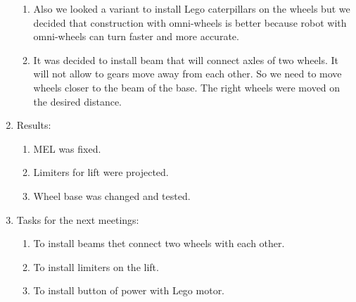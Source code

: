 \begin{enumerate}
\begin{enumerate}
		\item Also we looked a variant to install Lego caterpillars on the wheels but we decided that construction with omni-wheels is better because robot with omni-wheels can turn faster and more accurate.
		
		\item It was decided to install beam that will connect axles of two wheels. It will not allow to gears move away from each other. So we need to move wheels closer to the beam of the base. The right wheels were moved on the desired distance.  
		
	\end{enumerate}
	
	\item Results:
	\begin{enumerate}
		
		\item MEL was fixed. 
		
		\item Limiters for lift were projected.
		
		\item Wheel base was changed and tested.
		
	\end{enumerate}
	
	\item Tasks for the next meetings:
	\begin{enumerate}
		
		\item To install beams thet connect two wheels with each other.
		
		\item To install limiters on the lift.
		
		\item To install button of power with Lego motor.
		
	\end{enumerate}
\end{enumerate}
\fillpage
